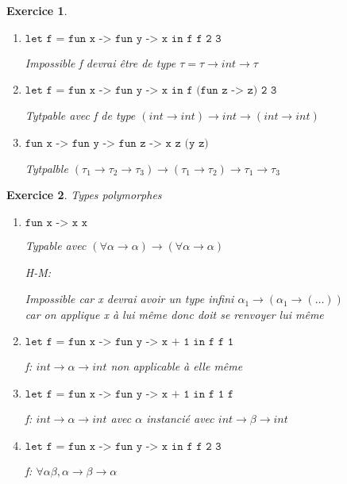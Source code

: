 \documentclass{article}
\theoremstyle{plain}
\newtheorem{exo}{Exercice}%
\begin{document}
\begin{exo}
\begin{enumerate}
    Impossible car f est de type $int \to int \to int$ 
    et il est appliqué à 3 $int$ au lieu de 2.

  \item $\texttt{let f = fun x -> fun y -> x in f f 2 3}$

    Impossible f devrai être de type $\tau = \tau \to int \to \tau$

  \item $\texttt{let f = fun x -> fun y -> x in f (fun z -> z) 2 3}$

    Tytpable avec f de type $(int \to int) \to int \to (int \to int)$

  \item $\texttt{fun x -> fun y -> fun z -> x z (y z)}$

    Tytpalble $(\tau_1 \to \tau_2 \to \tau_3) \to (\tau_1 \to \tau_2) 
              \to \tau_1 \to \tau_3$
\end{enumerate}
\end{exo}

\begin{exo} Types polymorphes
\begin{enumerate}
  \item $\texttt{fun x -> x x}$

    Typable avec $(\forall \alpha \to \alpha) \to (\forall \alpha \to \alpha)$

    H-M:
    
    Impossible car x devrai avoir un type infini 
        $\alpha_1 \to (\alpha_1 \to (\ldots))$ \\
    car on applique x à lui même donc doit se renvoyer lui même 

  \item $\texttt{let f = fun x -> fun y -> x + 1 in f f 1}$

    f: $int \to \alpha \to int$ non applicable à elle même

  \item $\texttt{let f = fun x -> fun y -> x + 1 in f 1 f}$

    f: $int \to \alpha \to int$ avec $\alpha$ instancié avec $int \to \beta \to int$

  \item $\texttt{let f = fun x -> fun y -> x in f f 2 3} $

    f: $\forall \alpha \beta, \alpha \to \beta \to \alpha$
\end{enumerate}
\end{exo} 

\newpage
\end{document}
